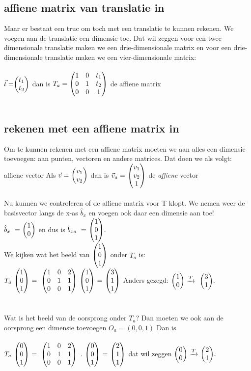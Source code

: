 \documentclass[hidelinks, a4wide, 12pt,  twoside]{book}
\begin{document}
\subsection{affiene  matrix van translatie in \RT}
Maar er bestaat een truc om  toch met een translatie te kunnen rekenen. We voegen aan de translatie een dimensie toe. Dat wil zeggen voor een twee-dimensionale translatie maken we een drie-dimensionale matrix en voor een drie-dimensionale translatie maken we een  vier-dimensionale matrix:\\ \\ 
 { $\vec{t} = \vectweesnel{t} $  \quad  dan is 
	$ T_a = \begin{pmatrix}  1 & 0 & t_1  \\  0 & 1 & t_2  \\ 0 & 0 & 1  \end{pmatrix} $ \quad de affiene matrix  } \\ \\
\subsection{rekenen met een affiene  matrix in \RT}
Om te kunnen rekenen met een affiene matrix moeten we aan alles een dimensie toevoegen: aan punten, vectoren en andere matrices. Dat doen we als volgt: 
\mydef
{affiene vector \RT}{Als  $\vec{v} = \ \vectweesnel{v} $ dan  is 
	$\vec{v}_a = \  \vecdrie{v_1}{v_2}{1}  $ \quad de \textit{affiene} vector } \\
 \\
Nu kunnen we  controleren of de affiene matrix voor\textit{ }T klopt. We nemen weer de basisvector langs de x-as $ \hat{b}_x $ en voegen ook daar een dimensie aan toe! \\
$ \hat{b}_x \ = \ \vectwee{1}{0} $ en dus is  
$ \hat{b}_{xa} \ = \  \vecdrie{1}{0}{1}. $ \\
We kijken wat het beeld van $ \vecdrie{1}{0}{1} $ onder \textit{$ T_a $} is: \\
$ T_a \ \vecdrie{1}{0}{1} \ 
= \ \matdrie{ 1 & 0 &  2 }{ 0 & 1 & 1 }{0 & 0 & 1 }  \ \vecdrie{1}{0}{1} \ 
=  \ \vecdrie{3}{1}{1} $  
\quad  Anders gezegd: \quad $ \vectwee{1}{0}  \  \xrightarrow{T}   \ \   \vectwee{ 3 } {1}. $\\ \\ \\
Wat is het beeld van de oorsprong onder \textit{$  T_a $}? Dan moeten we ook aan de oorsprong een dimensie toevoegen $ O_a = (0,0,1) $ Dan is \\ \\
$ T_a \ \vecdrie{0}{0}{1} \ 
= \ \matdrie{ 1 & 0 &  2 }{ 0 & 1 & 1 }{0 & 0 & 1 }  \ . \ \vecdrie{0}{0}{1} \ 
=  \ \vecdrie{2}{1}{1} $ 
\quad dat wil zeggen \quad
$ \vectwee{0}{0}  \  \xrightarrow{T}   \   \vectwee{ 2 } {1}. $\\
\end{document}
